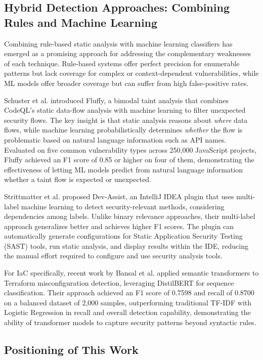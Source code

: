 \subsection{Hybrid Detection Approaches: Combining Rules and Machine Learning}

Combining rule-based static analysis with machine learning classifiers has emerged as a promising approach for addressing the complementary weaknesses of each technique. Rule-based systems offer perfect precision for enumerable patterns but lack coverage for complex or context-dependent vulnerabilities, while ML models offer broader coverage but can suffer from high false-positive rates.

Schuster et al. \cite{Schuster23} introduced Fluffy, a bimodal taint analysis that combines CodeQL's static data-flow analysis with machine learning to filter unexpected security flows. The key insight is that static analysis reasons about \emph{where} data flows, while machine learning probabilistically determines \emph{whether} the flow is problematic based on natural language information such as API names. Evaluated on five common vulnerability types across 250,000 JavaScript projects, Fluffy achieved an F1 score of 0.85 or higher on four of them, demonstrating the effectiveness of letting ML models predict from natural language information whether a taint flow is expected or unexpected.

Strittmatter et al. \cite{Strittmatter24} proposed Dev-Assist, an IntelliJ IDEA plugin that uses multi-label machine learning to detect security-relevant methods, considering dependencies among labels. Unlike binary relevance approaches, their multi-label approach generalizes better and achieves higher F1 scores. The plugin can automatically generate configurations for Static Application Security Testing (SAST) tools, run static analysis, and display results within the IDE, reducing the manual effort required to configure and use security analysis tools.

For IaC specifically, recent work by Bansal et al. \cite{Bansal26} applied semantic transformers to Terraform misconfiguration detection, leveraging DistilBERT for sequence classification. Their approach achieved an F1 score of 0.7598 and recall of 0.8700 on a balanced dataset of 2,000 samples, outperforming traditional TF-IDF with Logistic Regression in recall and overall detection capability, demonstrating the ability of transformer models to capture security patterns beyond syntactic rules.

\subsection{Positioning of This Work}

